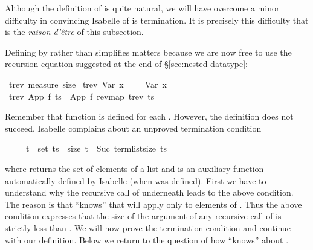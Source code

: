 %
\begin{isabellebody}%
\def\isabellecontext{Nested{\isadigit{1}}}%
%
\begin{isamarkuptext}%
\noindent
Although the definition of  is quite natural, we will have
overcome a minor difficulty in convincing Isabelle of is termination.
It is precisely this difficulty that is the \textit{raison d'\^etre} of
this subsection.

Defining  by  rather than 
simplifies matters because we are now free to use the recursion equation
suggested at the end of \S\ref{sec:nested-datatype}:%
\end{isamarkuptext}%
\ trev\ {\isachardoublequote}measure\ size{\isachardoublequote}\isanewline
\ {\isachardoublequote}trev\ {\isacharparenleft}Var\ x{\isacharparenright}\ \ \ \ {\isacharequal}\ Var\ x{\isachardoublequote}\isanewline
\ {\isachardoublequote}trev\ {\isacharparenleft}App\ f\ ts{\isacharparenright}\ {\isacharequal}\ App\ f\ {\isacharparenleft}rev{\isacharparenleft}map\ trev\ ts{\isacharparenright}{\isacharparenright}{\isachardoublequote}%
\begin{isamarkuptext}%
\noindent
Remember that function  is defined for each .
However, the definition does not succeed. Isabelle complains about an
unproved termination condition
\begin{isabelle}%
\ \ \ \ \ t\ {\isasymin}\ set\ ts\ {\isasymlongrightarrow}\ size\ t\ {\isacharless}\ Suc\ {\isacharparenleft}term{\isacharunderscore}list{\isacharunderscore}size\ ts{\isacharparenright}%
\end{isabelle}
where  returns the set of elements of a list
and  is an auxiliary
function automatically defined by Isabelle
(when  was defined).  First we have to understand why the
recursive call of  underneath  leads to the above
condition. The reason is that  ``knows'' that 
will apply  only to elements of . Thus the above
condition expresses that the size of the argument  of any
recursive call of  is strictly less than .  We will now prove the termination condition and
continue with our definition.  Below we return to the question of how
 ``knows'' about .%
\end{isamarkuptext}%
\end{isabellebody}%
